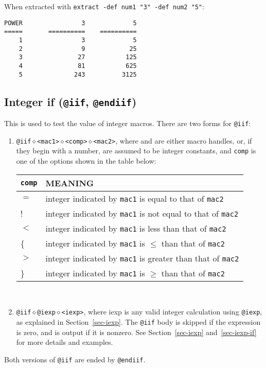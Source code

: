 \noindent
When extracted with {\tt extract -def num1 "3" -def num2 "5"}:
\begin{verbatim}
POWER                3             5
=====       ==========    ==========
    1                3             5
    2                9            25
    3               27           125
    4               81           625
    5              243          3125
\end{verbatim}

\subsection{Integer if ({\tt @iif}, {\tt @endiif})}
This is used to test the value of integer macros.  
There are two forms for {\tt @iif}:
\begin{enumerate}
\item {\tt @iif$\diamond$<mac1>$\diamond$<comp>$\diamond$<mac2>}, where
{\tt <mac1>} and {\tt <mac2>} are either macro handles, or, if they
begin with a number, are assumed to be integer constants,
and {\tt comp} is one of the options shown in the table below:\\
\begin{tabular}{|l|l|}\hline
{\tt comp} & MEANING\\\hline
$=$   & integer indicated by {\tt mac1} is equal to that of {\tt mac2}\\\hline
!     & integer indicated by {\tt mac1} is not equal to that of {\tt mac2}\\\hline
$<$ & integer indicated by {\tt mac1} is less than that of {\tt mac2}\\\hline
\{   & integer indicated by {\tt mac1} is $\le$ than that of {\tt mac2}\\\hline
$>$ & integer indicated by {\tt mac1} is greater than that of {\tt mac2}\\\hline
\}   & integer indicated by {\tt mac1} is $\ge$ than that of {\tt mac2}\\\hline
\end{tabular} \\

\item {\tt @iif$\diamond$@iexp$\diamond$<iexp>}, where iexp is any valid
      integer calculation using {\tt @iexp}, as explained in 
      Section~\ref{sec-iexp}.  The {\tt @iif} body is skipped if the
      expression is zero, and is output if it is nonzero.
      See Section~\ref{sec-iexp} and~\ref{sec-iexp-if} for more details
      and examples.
\end{enumerate}
Both versions of {\tt @iif} are ended by {\tt @endiif}.

